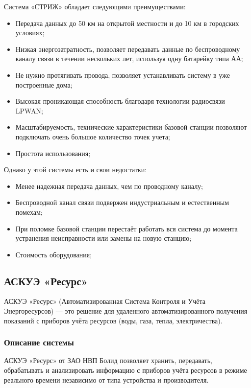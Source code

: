 Система «СТРИЖ» обладает следующими преимуществами:

\begin{itemize}
	\item Передача данных до 50 км на открытой местности и до 10 км в городских условиях;
	\item Низкая энергозатратность, позволяет передавать данные по беспроводному каналу связи в течении нескольких лет, используя одну батарейку типа АА;
	\item Не нужно протягивать провода, позволяет устанавливать систему в уже построенные дома;
	\item Высокая проникающая способность благодаря технологии радиосвязи LPWAN;
	\item Масштабируемость, технические характеристики базовой станции позволяют подключать очень большое количество точек учета;
	\item Простота использования;
\end{itemize}

Однако у этой системы есть и свои недостатки:
\begin{itemize}
	\item Менее надежная передача данных, чем по проводному каналу; 
	\item Беспроводной канал связи подвержен индустриальным и естественным помехам;
	\item При поломке базовой станции перестаёт работать вся система до момента устранения неисправности или замены на новую станцию;
	\item Стоимость оборудования;
\end{itemize}

\subsection{АСКУЭ «Ресурс»}

АСКУЭ «Ресурс» (Автоматизированная Система Контроля и Учёта Энергоресурсов) --- это решение для удаленного автоматизированного получения показаний с приборов учёта ресурсов (воды, газа, тепла, электричества). \cite{resurce}
\subsubsection{Описание системы}

АСКУЭ «Ресурс» от ЗАО НВП Болид позволяет хранить, передавать, обрабатывать и анализировать информацию с приборов учёта ресурсов в режиме реального времени независимо от типа устройства и производителя.


